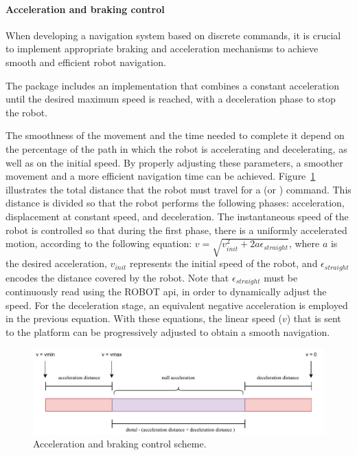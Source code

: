 \paragraph*{\textbf{Acceleration and braking control}}\label{par:start-and-brake-control}

When developing a navigation system based on discrete commands, it is crucial to implement appropriate braking and acceleration mechanisms to achieve smooth and efficient robot navigation.

The package includes an implementation that combines a constant acceleration until the desired maximum speed is reached, with a deceleration phase to stop the robot.

The smoothness of the movement and the time needed to complete it depend on the percentage of the path in which the robot is accelerating and decelerating, as well as on the initial speed.
By properly adjusting these parameters, a smoother movement and a more efficient navigation time can be achieved.
Figure~\ref{fig:acceleration_stop} illustrates the total distance that the robot must travel for a \moveforward (or \movebackward) command.
This distance is divided so that the robot performs the following phases: acceleration, displacement at constant speed, and deceleration.
The instantaneous speed of the robot is controlled so that during the first phase, there is a uniformly accelerated motion, according to the following equation: $v = \sqrt{v_{init}^2 + 2 a \epsilon_{straight}}$, where $a$ is the desired acceleration, $v_{init}$ represents the initial speed of the robot, and $\epsilon_{straight}$ encodes the distance covered by the robot.
Note that $\epsilon_{straight}$ must be continuously read using the ROBOT \acrshort{api}, in order to dynamically adjust the speed.
For the deceleration stage, an equivalent negative acceleration is employed in the previous equation.
With these equations, the linear speed ($v$) that is sent to the platform can be progressively adjusted to obtain a smooth navigation.

\begin{figure}
    \centering
    \includegraphics[width=\linewidth]{figures/ros4vsn/move_robot_acceleration}
    \caption{Acceleration and braking control scheme.}
    \label{fig:acceleration_stop}
\end{figure}

